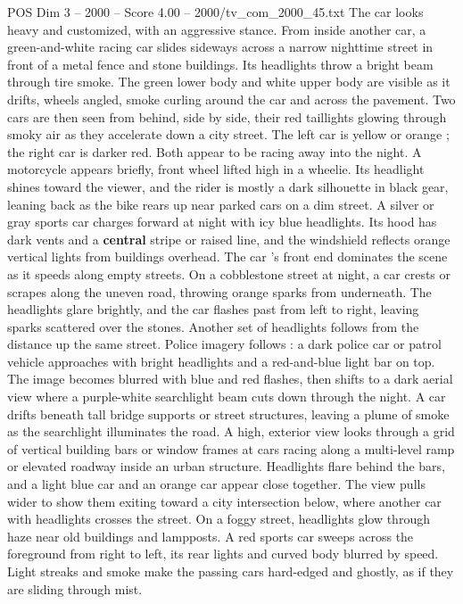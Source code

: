 \begin{textsample}{POS Dim 3 – 2000 – Score 4.00 – 2000/tv\_com\_2000\_45.txt}
The car looks heavy and customized, with an aggressive stance.
From inside another car, a green-and-white racing car slides sideways across a narrow nighttime street in front of a metal fence and stone buildings.
Its headlights throw a bright beam through tire smoke.
The green lower body and white upper body are visible as it drifts, wheels angled, smoke curling around the car and across the pavement.
Two cars are then seen from behind, side by side, their red taillights glowing through smoky air as they accelerate down a city street.
The left car is yellow or orange ; the right car is darker red.
Both appear to be racing away into the night.
A motorcycle appears briefly, front wheel lifted high in a wheelie.
Its headlight shines toward the viewer, and the rider is mostly a dark silhouette in black gear, leaning back as the bike rears up near parked cars on a dim street.
A silver or gray sports car charges forward at night with icy blue headlights.
Its hood has dark vents and a \textbf{central} stripe or raised line, and the windshield reflects orange vertical lights from buildings overhead.
The car ’s front end dominates the scene as it speeds along empty streets.
On a cobblestone street at night, a car crests or scrapes along the uneven road, throwing orange sparks from underneath.
The headlights glare brightly, and the car flashes past from left to right, leaving sparks scattered over the stones.
Another set of headlights follows from the distance up the same street.
Police imagery follows : a dark police car or patrol vehicle approaches with bright headlights and a red-and-blue light bar on top.
The image becomes blurred with blue and red flashes, then shifts to a dark aerial view where a purple-white searchlight beam cuts down through the night.
A car drifts beneath tall bridge supports or street structures, leaving a plume of smoke as the searchlight illuminates the road.
A high, exterior view looks through a grid of vertical building bars or window frames at cars racing along a multi-level ramp or elevated roadway inside an urban structure.
Headlights flare behind the bars, and a light blue car and an orange car appear close together.
The view pulls wider to show them exiting toward a city intersection below, where another car with headlights crosses the street.
On a foggy street, headlights glow through haze near old buildings and lampposts.
A red sports car sweeps across the foreground from right to left, its rear lights and curved body blurred by speed.
Light streaks and smoke make the passing cars hard-edged and ghostly, as if they are sliding through mist.

\end{textsample}
